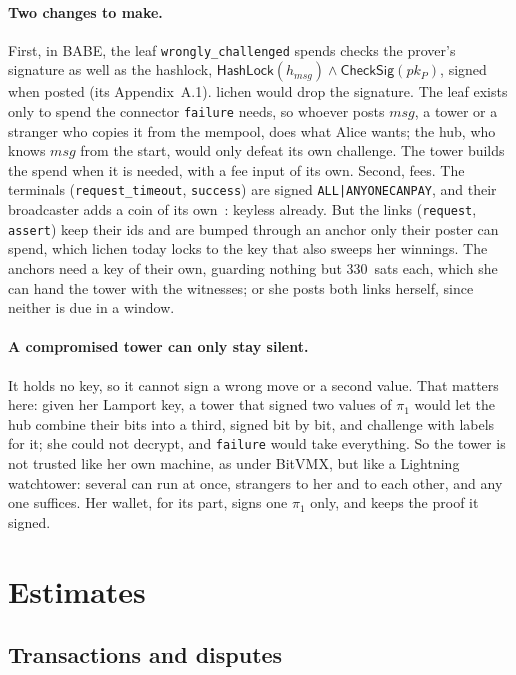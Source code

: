 \documentclass[11pt]{article}
\newcommand{\tx}[1]{\texttt{#1}}
\begin{document}
\paragraph{Two changes to make.} First, in BABE, the leaf
\tx{wrongly\_challenged} spends checks the prover's signature as well as
the hashlock, $\mathsf{HashLock}(h_{\mathit{msg}}) \wedge
\mathsf{CheckSig}(pk_P)$, signed when posted (its Appendix~A.1). lichen
would drop the signature. The leaf exists only to spend the connector \tx{failure}
needs, so whoever posts $\mathit{msg}$, a tower or a stranger who copies
it from the mempool, does what Alice wants; the hub, who knows
$\mathit{msg}$ from the start, would only defeat its own challenge. The
tower builds the spend when it is needed, with a fee input of its own.
Second, fees. The terminals (\tx{request\_timeout}, \tx{success}) are signed
\texttt{ALL|ANYONECANPAY}, and their broadcaster adds a coin of its
own~\cite[\S 6]{lichenbitvmx}: keyless already. But the links
(\tx{request}, \tx{assert}) keep their ids and are bumped through an
anchor only their poster can spend, which lichen today locks to the key
that also sweeps her winnings. The anchors need a key of their own,
guarding nothing but 330~sats each, which she can hand the tower with
the witnesses; or she posts both links herself, since neither is due in
a window.

\paragraph{A compromised tower can only stay silent.} It holds no key,
so it cannot sign a wrong move or a second value. That matters here:
given her Lamport key, a tower that signed two values of $\pi_1$ would
let the hub combine their bits into a third, signed bit by bit, and
challenge with labels for it; she could not decrypt, and \tx{failure}
would take everything. So the tower is not trusted like her own machine,
as under BitVMX, but like a Lightning watchtower: several can run at
once, strangers to her and to each other, and any one suffices. Her
wallet, for its part, signs one $\pi_1$ only, and keeps the proof it
signed.

\section{Estimates}
\label{sec:costs}

\subsection{Transactions and disputes}
\end{document}
